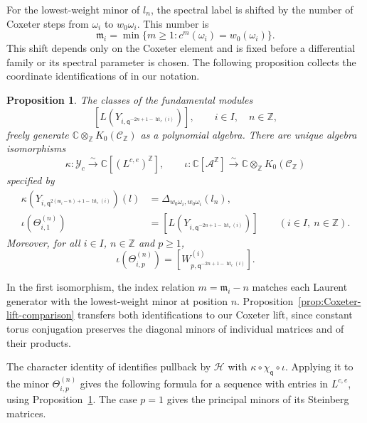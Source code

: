 \documentclass[11pt,leqno]{amsart}
\numberwithin{equation}{section}
\theoremstyle{plain}
\newtheorem{proposition}[theorem]{Proposition}
\theoremstyle{definition}
\theoremstyle{plain}
\theoremstyle{definition}
\theoremstyle{remark}
\newcommand{\qaff}{\mathsf q}
\begin{document}
For the lowest-weight minor of $l_n$, the spectral label is shifted by the number of Coxeter steps from $\omega_i$ to $w_0\omega_i$. This number is
\[
 \mathfrak m_i=\min\{m\ge1:c^m(\omega_i)=w_0(\omega_i)\}.
\]
This shift depends only on the Coxeter element and is fixed before a differential family or its spectral parameter is chosen.  The following proposition collects the coordinate identifications of \cite[Section~5.3, Proposition~20, and Section~6.2]{FL2025} in our notation.
\begin{proposition}\label{prop:Miura-character-coordinate-identifications}
The classes of the fundamental modules
\[
 \left[L\!\left(Y_{i,\qaff^{-2n+1-\operatorname{ht}_c(i)}}\right)\right],
 \qquad i\in I,\quad n\in\mathbb Z,
\]
freely generate $\mathbb C\otimes_{\mathbb Z}K_0(\mathcal C_{\mathbb Z})$ as a polynomial algebra.  There are unique algebra isomorphisms
\[
 \kappa:\mathscr Y_c\xrightarrow{\sim}
       \mathbb C[(L^{c,e})^{\mathbb Z}],
 \qquad
 \iota:\mathbb C[\mathcal A^{\mathbb Z}]
       \xrightarrow{\sim}\mathbb C\otimes_{\mathbb Z}K_0(\mathcal C_{\mathbb Z})
\]
specified by
\[
 \begin{aligned}
 \kappa\!\left(
       Y_{i,\qaff^{2(\mathfrak m_i-n)+1-\operatorname{ht}_c(i)}}
       \right)(l)
 &=\Delta_{w_0\omega_i,w_0\omega_i}(l_n),\\
 \iota(\Theta_{i,1}^{(n)})
 &=\left[L\!\left(Y_{i,\qaff^{-2n+1-\operatorname{ht}_c(i)}}\right)\right]
 \qquad(i\in I,\ n\in\mathbb Z).
 \end{aligned}
\]
Moreover, for all $i\in I$, $n\in\mathbb Z$ and $p\ge1$,
\[
 \iota(\Theta_{i,p}^{(n)})
 =\left[W^{(i)}_{p,\qaff^{-2n+1-\operatorname{ht}_c(i)}}\right].
\]
\end{proposition}
In the first isomorphism, the index relation $m=\mathfrak m_i-n$ matches each Laurent generator with the lowest-weight minor at position $n$.  Proposition~\ref{prop:Coxeter-lift-comparison} transfers both identifications to our Coxeter lift, since constant torus conjugation preserves the diagonal minors of individual matrices and of their products.

The character identity of \cite[Theorem~30]{FL2025} identifies pullback by $\mathcal H$ with $\kappa\circ\chi_{\qaff}\circ\iota$. Applying it to the minor $\Theta_{i,p}^{(n)}$ gives the following formula for a sequence with entries in $L^{c,e}$, using Proposition~\ref{prop:Miura-character-coordinate-identifications}. The case $p=1$ gives the principal minors of its Steinberg matrices.
\end{document}
